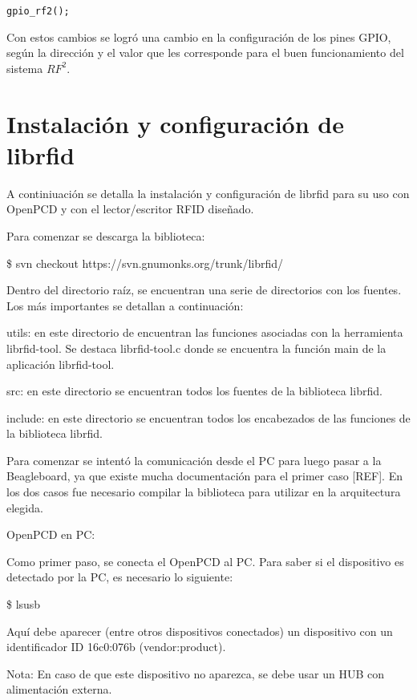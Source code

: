 \begin{verbatim}
gpio_rf2();
\end{verbatim}

Con estos cambios se logró una cambio en la configuración de los pines GPIO, según la dirección y el valor que les corresponde para el buen funcionamiento del sistema $RF^{2}$.


\section{Instalación y configuración de librfid}

A continiuación se detalla la instalación y configuración de librfid para su uso con OpenPCD y con el lector/escritor RFID diseñado.

Para comenzar se descarga la biblioteca:

\bigskip
\centerline{\$ svn checkout https://svn.gnumonks.org/trunk/librfid/}

\bigskip
Dentro del directorio raíz, se encuentran una serie de directorios con los fuentes. Los más importantes se detallan a continuación:

\bigskip
utils: en este directorio de encuentran las funciones asociadas con la herramienta librfid-tool. Se destaca librfid-tool.c donde se encuentra la función main de la aplicación librfid-tool.

\bigskip
src: en este directorio se encuentran todos los fuentes de la biblioteca librfid.

\bigskip
include: en este directorio se encuentran todos los encabezados de las funciones de la biblioteca librfid.


\bigskip
{}

\bigskip
Para comenzar se intentó la comunicación desde el PC para luego pasar a la Beagleboard, ya que existe mucha documentación para el primer caso [REF]. En los dos casos fue necesario compilar la biblioteca para utilizar en la arquitectura elegida.

\bigskip
OpenPCD en PC:

\bigskip
Como primer paso, se conecta el OpenPCD al PC. Para saber si el dispositivo es detectado por la PC, es necesario lo siguiente:

\bigskip
\centerline{\$ lsusb}

\bigskip
Aquí debe aparecer (entre otros dispositivos conectados) un dispositivo con un identificador ID 16c0:076b (vendor:product). 

\bigskip
Nota: En caso de que este dispositivo no aparezca, se debe usar un HUB con alimentación externa.


